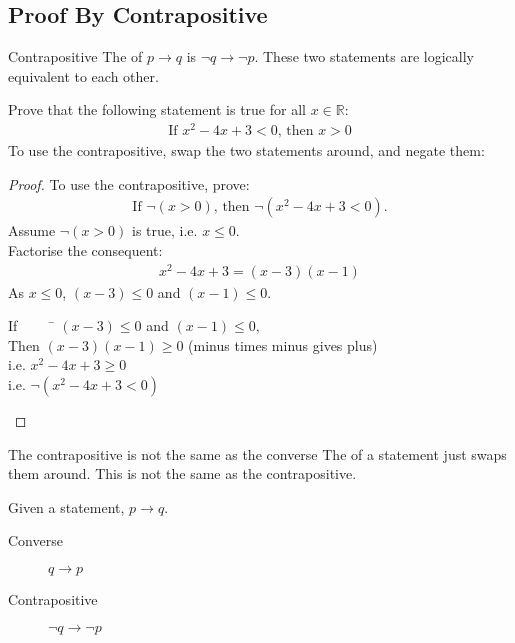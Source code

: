 \documentclass[../notes.tex]{subfiles}
\begin{document}
			\subsection{Proof By Contrapositive}
				\begin{definition}{Contrapositive}
					The  of $p \rightarrow q$ is $\lnot q \rightarrow \lnot p$. These two statements are logically equivalent to each other.
				\end{definition}
				\begin{example}
					Prove that the following statement is true for all $x \in \mathbb{R}$:
					\begin{align*}
						\text{If } x^{2} - 4x + 3 < 0 \text{, then } x > 0
					\end{align*}
					To use the contrapositive, swap the two statements around, and negate them:
					\begin{proof}
						To use the contrapositive, prove:
						\begin{align*}
							\text{If } \lnot(x > 0) \text{, then } \lnot(x^{2} - 4x + 3 < 0).
						\end{align*}
						Assume $\lnot (x > 0)$ is true, i.e. $x \leq 0$.\\
						Factorise the consequent:
						\begin{align*}
							x^{2} - 4x + 3 = (x - 3)(x - 1)
						\end{align*}
						As $x \leq 0$, $(x - 3) \leq 0$ and $(x - 1) \leq 0$.
						\begin{tabbing}
							If $\qquad$ \= $(x - 3) \leq 0$ and $(x - 1) \leq 0$,\\
							Then \> $(x - 3)(x - 1) \geq 0$ (minus times minus gives plus)\\
							i.e. \> $x^{2} - 4x + 3 \geq 0$\\
							i.e. \> $\lnot (x^{2} - 4x + 3 < 0)$
						\end{tabbing}
					\end{proof}
				\end{example}
				\begin{sidenote}[width=0.8\textwidth]{The contrapositive is not the same as the converse}
					The  of a statement just swaps them around. This is not the same as the contrapositive.
					\begin{example}[width=0.6\textwidth]
						Given a statement, $p \rightarrow q$.
						\begin{description}
							\item[Converse] $q \rightarrow p$
							\item[Contrapositive] $\lnot q \rightarrow \lnot p$ 
						\end{description} 
					\end{example}
				\end{sidenote}
\end{document}
